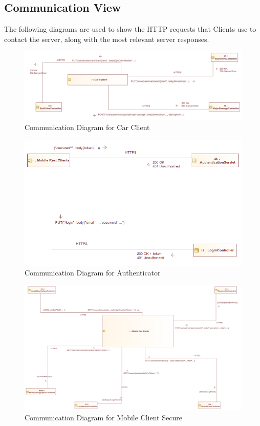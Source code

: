 \documentclass[12pt]{article}
\begin{document}
\subsection{Communication View}
The following diagrams are used to show the HTTP requests that Clients use to contact the server, along with the most relevant server responses.

\begin{figure}[h]
	\centering
	\includegraphics[width=\textwidth]{../Images/CarClient_Communication}
	\caption{Communication Diagram for Car Client}
\end{figure}

\begin{figure}[h]
	\centering
	\includegraphics[width=\textwidth]{../Images/MobileAuth_Communication}
	\caption{Communication Diagram for Authenticator}
\end{figure}

\begin{figure}[h]
	\centering
	\includegraphics[width=\textwidth]{../Images/MobileClient_SecuredCommunication}
	\caption{Communication Diagram for Mobile Client Secure}
\end{figure}
\end{document}
